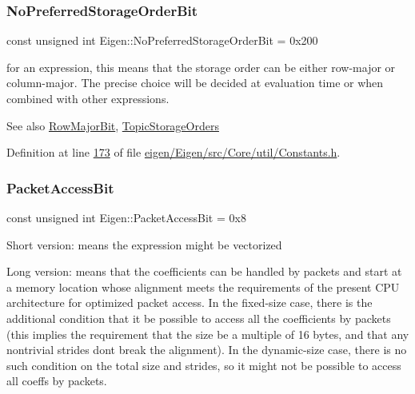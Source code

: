\mbox{\label{group__flags_ga3c186ad80ddcf5e2ed3d7ee31cca1860}} 
\subsubsection{\texorpdfstring{No\+Preferred\+Storage\+Order\+Bit}{NoPreferredStorageOrderBit}}
{\footnotesize\ttfamily const unsigned int Eigen\+::\+No\+Preferred\+Storage\+Order\+Bit = 0x200}

for an expression, this means that the storage order can be either row-\/major or column-\/major. The precise choice will be decided at evaluation time or when combined with other expressions. \begin{DoxySeeAlso}{See also}
\hyperlink{group__flags_gae4f56c2a60bbe4bd2e44c5b19cbe8762}{Row\+Major\+Bit}, \hyperlink{group___topic_storage_orders}{Topic\+Storage\+Orders} 
\end{DoxySeeAlso}


Definition at line \hyperlink{eigen_2_eigen_2src_2_core_2util_2_constants_8h_source_l00173}{173} of file \hyperlink{eigen_2_eigen_2src_2_core_2util_2_constants_8h_source}{eigen/\+Eigen/src/\+Core/util/\+Constants.\+h}.

\mbox{\label{group__flags_ga1a306a438e1ab074e8be59512e887b9f}} 
\subsubsection{\texorpdfstring{Packet\+Access\+Bit}{PacketAccessBit}}
{\footnotesize\ttfamily const unsigned int Eigen\+::\+Packet\+Access\+Bit = 0x8}

Short version\+: means the expression might be vectorized

Long version\+: means that the coefficients can be handled by packets and start at a memory location whose alignment meets the requirements of the present C\+PU architecture for optimized packet access. In the fixed-\/size case, there is the additional condition that it be possible to access all the coefficients by packets (this implies the requirement that the size be a multiple of 16 bytes, and that any nontrivial strides don\textquotesingle{}t break the alignment). In the dynamic-\/size case, there is no such condition on the total size and strides, so it might not be possible to access all coeffs by packets.

